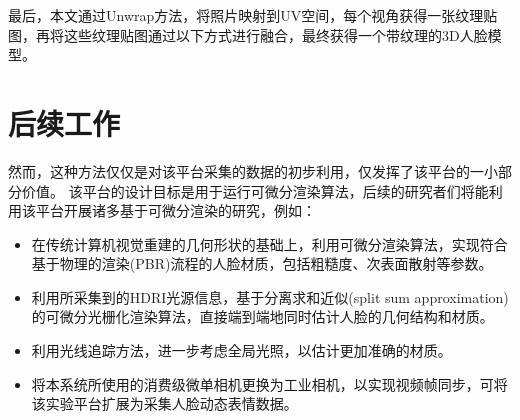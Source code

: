 最后，本文通过Unwrap方法，将照片映射到UV空间，每个视角获得一张纹理贴图，再将这些纹理贴图通过以下方式进行融合，最终获得一个带纹理的3D人脸模型。



\section{后续工作}

然而，这种方法仅仅是对该平台采集的数据的初步利用，仅发挥了该平台的一小部分价值。
该平台的设计目标是用于运行可微分渲染算法，后续的研究者们将能利用该平台开展诸多基于可微分渲染的研究，例如：
\begin{itemize}
\item 在传统计算机视觉重建的几何形状的基础上，利用可微分渲染算法，实现符合基于物理的渲染(PBR)流程的人脸材质，包括粗糙度、次表面散射等参数。
\item 利用所采集到的HDRI光源信息，基于分离求和近似(split sum approximation)的可微分光栅化渲染算法，直接端到端地同时估计人脸的几何结构和材质。
\item 利用光线追踪方法，进一步考虑全局光照，以估计更加准确的材质。
\item 将本系统所使用的消费级微单相机更换为工业相机，以实现视频帧同步，可将该实验平台扩展为采集人脸动态表情数据。
\end{itemize}
